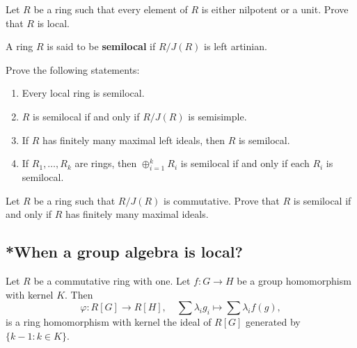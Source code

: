 \begin{exercise}
\label{xca:nilp_or_unit}
    Let $R$ be a ring such that every element of $R$ is either 
    nilpotent or a unit. Prove that $R$ is local. 
\end{exercise}

A ring $R$ is said to be \textbf{semilocal} if $R/J(R)$ is left artinian. 

\begin{exercise}
\label{xca:semilocal}
    Prove the following statements:
    \begin{enumerate}
        \item Every local ring is semilocal.
        \item $R$ is semilocal if and only if $R/J(R)$ is semisimple.
        \item If $R$ has finitely many maximal left ideals, then $R$ is semilocal. 
        \item If $R_1,\dots,R_k$ are rings, then $\oplus_{i=1}^k R_i$ is semilocal
            if and only if each $R_i$ is semilocal. 
    \end{enumerate}
\end{exercise}

\begin{example}
\label{xca:semilocal_commutative}
    Let $R$ be a ring such that $R/J(R)$ is commutative. Prove
    that $R$ is semilocal if and only if $R$ has finitely many maximal ideals. 
\end{example}

\subsection{*When a group algebra is local?}

\begin{proposition}
    \label{pro:augmentation}
    Let $R$ be a commutative ring with one. 
    Let $f\colon G\to H$ be a group homomorphism with kernel $K$. Then
    \[
    \varphi\colon R[G]\to R[H],
    \quad 
    \sum\lambda_ig_i\mapsto \sum\lambda_if(g),
    \]
    is a ring homomorphism with kernel the ideal 
    of $R[G]$ generated by $\{k-1:k\in K\}$. 
\end{proposition}

